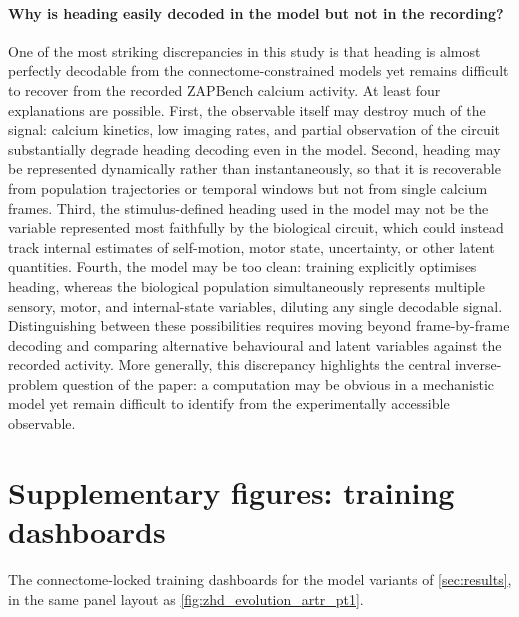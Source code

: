 \documentclass[11pt]{article}
\begin{document}
\paragraph{Why is heading easily decoded in the model but not in the
recording?}\label{out:decodability}
One of the most striking discrepancies in this study is that heading is almost
perfectly decodable from the connectome-constrained models yet remains difficult
to recover from the recorded ZAPBench calcium activity. At least four
explanations are possible. First, the observable itself may destroy much of the
signal: calcium kinetics, low imaging rates, and partial observation of the
circuit substantially degrade heading decoding even in the model. Second,
heading may be represented dynamically rather than instantaneously, so that it
is recoverable from population trajectories or temporal windows but not from
single calcium frames. Third, the stimulus-defined heading used in the model may
not be the variable represented most faithfully by the biological circuit, which
could instead track internal estimates of self-motion, motor state, uncertainty,
or other latent quantities. Fourth, the model may be too clean: training
explicitly optimises heading, whereas the biological population simultaneously
represents multiple sensory, motor, and internal-state variables, diluting any
single decodable signal. Distinguishing between these possibilities requires
moving beyond frame-by-frame decoding and comparing alternative behavioural and
latent variables against the recorded activity. More generally, this discrepancy
highlights the central inverse-problem question of the paper: a computation may
be obvious in a mechanistic model yet remain difficult to identify from the
experimentally accessible observable.

\appendix
\section{Supplementary figures: training dashboards}
\label{app:dashboards}
The connectome-locked training dashboards for the model variants of \cref{sec:results}, in the same panel layout as \cref{fig:zhd_evolution_artr_pt1}.
\end{document}
